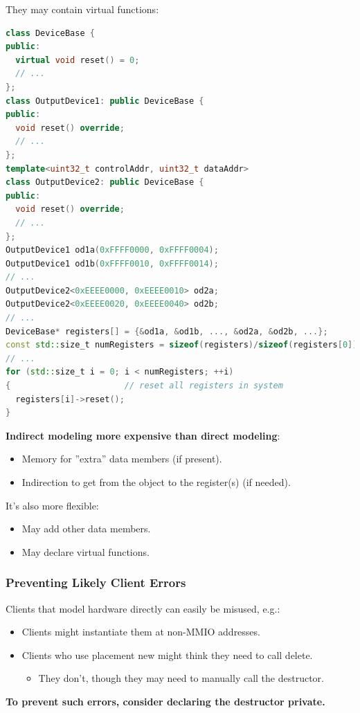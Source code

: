 They may contain virtual functions:
\begin{lstlisting}[language=C++]
class DeviceBase {
public:
  virtual void reset() = 0;
  // ...
};
class OutputDevice1: public DeviceBase {
public:
  void reset() override;
  // ...
};
template<uint32_t controlAddr, uint32_t dataAddr>
class OutputDevice2: public DeviceBase {
public:
  void reset() override;
  // ...
};
OutputDevice1 od1a(0xFFFF0000, 0xFFFF0004);
OutputDevice1 od1b(0xFFFF0010, 0xFFFF0014);
// ...
OutputDevice2<0xEEEE0000, 0xEEEE0010> od2a;
OutputDevice2<0xEEEE0020, 0xEEEE0040> od2b;
// ...
DeviceBase* registers[] = {&od1a, &od1b, ..., &od2a, &od2b, ...};
const std::size_t numRegisters = sizeof(registers)/sizeof(registers[0]);
// ...
for (std::size_t i = 0; i < numRegisters; ++i)
{                       // reset all registers in system
  registers[i]->reset();
}
\end{lstlisting}

\textbf{Indirect modeling more expensive than direct modeling}:
\begin{itemize}
  \item Memory for ''extra'' data members (if present).
  \item Indirection to get from the object to the register(s) (if needed).
\end{itemize}
It's also more flexible:
\begin{itemize}
  \item May add other data members.
  \item May declare virtual functions.
\end{itemize}


\subsubsection{Preventing Likely Client Errors}
Clients that model hardware directly can easily be misused, e.g.:
\begin{itemize}
  \item Clients might instantiate them at non-MMIO addresses.
  \item Clients who use placement new might think they need to call delete.
  \begin{itemize}
    \item They don't, though they may need to manually call the destructor.
  \end{itemize}
\end{itemize}
\textbf{To prevent such errors, consider declaring the destructor private.}


